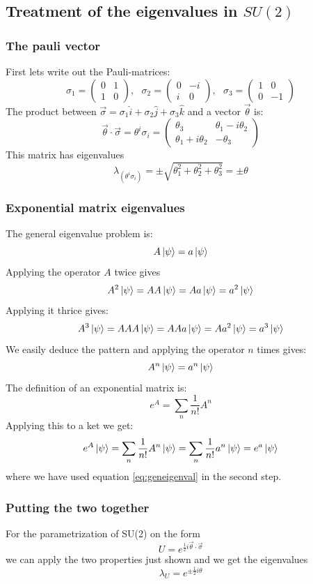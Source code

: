 \documentclass[a4,10pt,titlepage]{article}
\renewcommand\[{\begin{equation*}}
\renewcommand\]{\end{equation*}}
\newcommand{\be}{\begin{equation}}
\newcommand{\ee}{\end{equation}}
\numberwithin{equation}{section}
\newcommand{\half}{\frac{1}{2}}
\begin{document}
\subsection{Treatment of the eigenvalues in $SU(2)$}
\subsubsection{The pauli vector}
First lets write out the Pauli-matrices:
\[
\sigma_1=
\begin{pmatrix}
0 & 1 \\
1 & 0
\end{pmatrix},\:\:\:\sigma_2=\begin{pmatrix}
0 & -i \\
i & 0
\end{pmatrix},
\:\:\:\sigma_3=\begin{pmatrix}
1 & 0 \\
0 & -1
\end{pmatrix}
\]
The product between $\vec{\sigma}=\sigma_1\hat{i}+\sigma_2\hat{j}+\sigma_3\hat{k}$ and a vector $\vec{\theta}$ is:
\[
\vec{\theta}\cdot\vec{\sigma}=\theta^i\sigma_i=\begin{pmatrix}
\theta_3 & \theta_1-i\theta_2\\
\theta_1+i\theta_2 & -\theta_3
\end{pmatrix}
\]
This matrix has eigenvalues
\[
\lambda_{(\theta^i\sigma_i)}=\pm\sqrt{\theta_1^2+\theta_2^2+\theta_3^2}=\pm\theta
\]
\subsubsection{Exponential matrix eigenvalues}
The general eigenvalue problem is:
\be
A\ket{\psi}=a\ket{\psi}
\ee
Applying the operator $A$ twice gives
\[
A^2\ket{\psi}=AA\ket{\psi}=Aa\ket{\psi}=a^2\ket{\psi}
\]
Applying it thrice gives:
\[
A^3\ket{\psi}=AAA\ket{\psi}=AAa\ket{\psi}=Aa^2\ket{\psi}=a^3\ket{\psi}
\]
We easily deduce the pattern and applying the operator $n$ times gives:
\be \label{eq:geneigenval}
A^n\ket{\psi}=a^n\ket{\psi}
\ee
The definition of an exponential matrix is:
\[
e^A=\sum_n\frac{1}{n!}A^n
\]
Applying this to a ket we get:
\[
e^A\ket{\psi}=\sum_n\frac{1}{n!}A^n\ket{\psi}=\sum_n\frac{1}{n!}a^n\ket{\psi}=e^a\ket{\psi}
\]
where we have used equation \ref{eq:geneigenval} in the second step.
\subsubsection{Putting the two together}
For the parametrization of SU(2) on the form
\[
U=e^{\half i\vec{\theta}\cdot\vec{\sigma}}
\]
we can apply the two properties just shown and we get the eigenvalues
\be
\lambda_U=e^{\pm \half i\theta}
\ee
\end{document}
